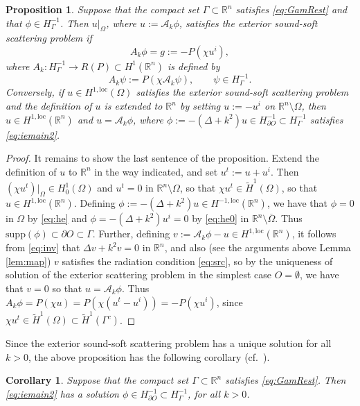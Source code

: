\documentclass{birkjour}
\newtheorem{proposition}[theorem]{Proposition}
\newtheorem{corollary}[theorem]{Corollary}
\theoremstyle{definition}
\theoremstyle{remark}
\numberwithin{equation}{section}
\newcommand{\R}{\mathbb{R}}
\newcommand{\Hol}{H^{1,\mathrm{loc}}}
\newcommand{\cA}{\mathcal{A}}
\newcommand{\supp}{\mathrm{supp}}
\begin{document}
\begin{proposition} \label{prop:ie1} 
Suppose that the compact set $\Gamma\subset \R^n$ satisfies \eqref{eq:GamRest} and that $\phi\in H^{-1}_\Gamma$. Then $u|_\Omega$, where $u:=\cA_k \phi$, satisfies the exterior sound-soft scattering problem if 
\begin{equation} \label{eq:iemain2}
A_k\phi = g := -P(\chi u^i),
\end{equation}
where $A_k:H^{-1}_{\Gamma}\to R(P)\subset H^1(\R^n)$ is defined by
\begin{equation} \label{eq:Akdef2}
A_k\psi:=P(\chi \mathcal{A}_k\psi), \qquad \psi \in H^{-1}_\Gamma.
\end{equation}
Conversely, if $u\in \Hol(\Omega)$ satisfies the exterior sound-soft scattering problem and the definition of $u$ is extended to $\R^n$ by setting $u:=-u^i$ on $\R^n\setminus \Omega$, then $u\in \Hol(\R^n)$ and $u=\cA_k\phi$, where $\phi:= -(\Delta+k^2)u\in H^{-1}_{\partial O}\subset H^{-1}_\Gamma$ satisfies \eqref{eq:iemain2}.
\end{proposition}
\begin{proof} It remains to show the last sentence of the proposition. Extend the definition of $u$ to $\R^n$ in the way indicated, and set $u^t:=u+u^i$. Then $(\chi u^t)|_\Omega\in H_0^1(\Omega)$ and $u^t=0$ in $\R^n\setminus \Omega$, so that $\chi u^t\in \widetilde H^1(\Omega)$, so that $u\in \Hol(\R^n)$.  Defining $\phi:= -(\Delta+k^2)u\in H^{-1,\mathrm{loc}}(\R^n)$, we have that $\phi=0$ in $\Omega$ by \eqref{eq:he} and $\phi=-(\Delta+k^2)u^i=0$ by \eqref{eq:he0} in $\R^n\setminus \overline{\Omega}$. Thus $\supp(\phi) \subset \partial O \subset \Gamma$. Further, defining $v:=\cA_k \phi - u\in \Hol(\R^n)$, it follows from \eqref{eq:inv} that $\Delta v + k^2 v=0$ in $\R^n$, and also (see the arguments above Lemma \ref{lem:map}) $v$ satisfies the radiation condition \eqref{eq:src}, so by the uniqueness of solution of  the exterior scattering problem in the simplest case $O=\emptyset$, we have that $v=0$ so that $u=\cA_k\phi$. Thus $A_k \phi = P(\chi u) = P(\chi(u^t-u^i))=-P(\chi u^i)$, since $\chi u^t\in \widetilde H^1(\Omega)\subset \widetilde H^1(\Gamma^c)$. 
\end{proof}



Since the exterior sound-soft scattering problem has a unique solution for all $k>0$, the above proposition has the following corollary (cf.~\cite[Prop.~3.6]{caetano2025integral}). 

\begin{corollary} \label{cor:exists}
Suppose that the compact set $\Gamma\subset \R^n$ satisfies \eqref{eq:GamRest}. Then \eqref{eq:iemain2} has a solution $\phi\in H^{-1}_{\partial O} \subset H^{-1}_\Gamma$, for all $k>0$. 
\end{corollary}
\end{document}
